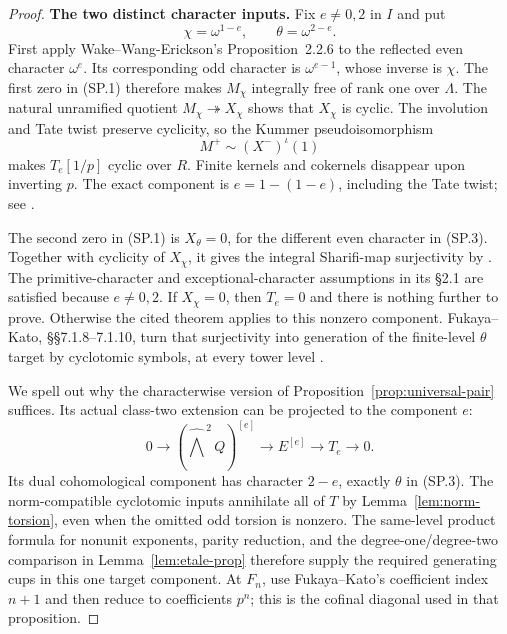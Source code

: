 \begin{proof}
\par\medskip\noindent\textbf{The two distinct character inputs.}
Fix $e\ne0,2$ in $I$ and put
\[
              \chi=\omega^{1-e},\qquad
              \theta=\omega^{2-e}.
 \tag{SP.3}
\]
First apply Wake--Wang-Erickson's Proposition~2.2.6 to the
reflected even character $\omega^e$. Its corresponding odd
character is $\omega^{e-1}$, whose inverse is $\chi$.
The first zero in (SP.1) therefore makes $M_\chi$ integrally
free of rank one over $\Lambda$. The natural unramified
quotient $M_\chi\twoheadrightarrow X_\chi$ shows that
$X_\chi$ is cyclic. The involution and Tate twist preserve
cyclicity, so the Kummer pseudoisomorphism
\[
                         M^+\sim(X^-)^\iota(1)
\]
makes $T_e[1/p]$ cyclic over $R$. Finite kernels and cokernels
disappear upon inverting $p$. The exact component is $e=1-(1-e)$,
including the Tate twist; see
\cite[Proposition~3.4.7 and Corollary~3.4.8,
p.~92]{SharifiIwasawaNotes}.

The second zero in (SP.1) is $X_\theta=0$, for the different
even character in (SP.3). Together with cyclicity of $X_\chi$,
it gives the integral Sharifi-map surjectivity by
\cite[Corollary~5.1.2 and its proof, p.~11]{WakeWangErickson2017}.
The primitive-character and exceptional-character assumptions
in its \S2.1 are satisfied because $e\ne0,2$. If $X_\chi=0$,
then $T_e=0$ and there is nothing further to prove. Otherwise
the cited theorem applies to this nonzero component.
Fukaya--Kato, \S\S7.1.8--7.1.10, turn that surjectivity into
generation of the finite-level $\theta$ target by cyclotomic
symbols, at every tower level
\cite[p.~86]{FukayaKato2012}.

We spell out why the characterwise version of
Proposition~\ref{prop:universal-pair} suffices. Its actual
class-two extension can be projected to the component $e$:
\[
0\longrightarrow
 (\widehat{\bigwedge}^{\,2}Q)^{[e]}
 \longrightarrow E^{[e]}
 \longrightarrow T_e\longrightarrow0.
\]
Its dual cohomological component has character $2-e$, exactly
$\theta$ in (SP.3). The norm-compatible cyclotomic inputs
annihilate all of $T$ by Lemma~\ref{lem:norm-torsion}, even
when the omitted odd torsion is nonzero. The same-level product
formula for nonunit exponents, parity reduction, and the
degree-one/degree-two comparison in
Lemma~\ref{lem:etale-prop} therefore supply the required
generating cups in this one target component. At $F_n$, use
Fukaya--Kato's coefficient index $n+1$ and then reduce to
coefficients $p^n$; this is the cofinal diagonal used in that
proposition.


\end{proof}
